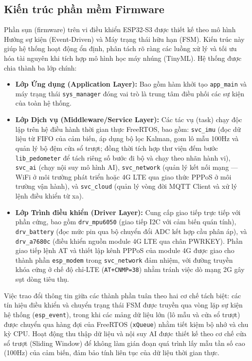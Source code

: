 \documentclass[../DoAn.tex]{subfiles}
\begin{document}
\subsection{Kiến trúc phần mềm Firmware}
Phần sụn (firmware) trên vi điều khiển ESP32-S3 được thiết kế theo mô hình Hướng sự kiện (Event-Driven) và Máy trạng thái hữu hạn (FSM). Kiến trúc này giúp hệ thống hoạt động ổn định, phân tách rõ ràng các luồng xử lý và tối ưu hóa tài nguyên khi tích hợp mô hình học máy nhúng (TinyML). Hệ thống được chia thành ba lớp chính:
\begin{itemize}
    \item \textbf{Lớp Ứng dụng (Application Layer):} Bao gồm hàm khởi tạo \texttt{app\_main} và máy trạng thái \texttt{sys\_manager} đóng vai trò là trung tâm điều phối các sự kiện của toàn hệ thống.
    \item \textbf{Lớp Dịch vụ (Middleware/Service Layer):} Các tác vụ (task) chạy độc lập trên hệ điều hành thời gian thực FreeRTOS, bao gồm: \texttt{svc\_imu} (đọc dữ liệu từ FIFO của cảm biến, áp dụng bộ lọc Kalman, gom lô mẫu 100Hz và quản lý bộ đệm cửa sổ trượt; đồng thời tích hợp thư viện đếm bước \texttt{lib\_pedometer} để tách riêng số bước đi bộ và chạy theo nhãn hành vi), \texttt{svc\_ai} (chạy nội suy mô hình AI), \texttt{svc\_network} (quản lý kết nối mạng --- WiFi ở môi trường phát triển hoặc 4G LTE qua giao thức PPPoS ở môi trường vận hành), và \texttt{svc\_cloud} (quản lý vòng đời MQTT Client và xử lý lệnh điều khiển từ xa).
    \item \textbf{Lớp Trình điều khiển (Driver Layer):} Cung cấp giao tiếp trực tiếp với phần cứng, bao gồm \texttt{drv\_mpu6050} (giao tiếp I2C với cảm biến quán tính), \texttt{drv\_battery} (đọc mức pin qua bộ chuyển đổi ADC kết hợp cầu phân áp), và \texttt{drv\_a7680c} (điều khiển nguồn module 4G LTE qua chân PWRKEY). Phần giao tiếp lệnh AT và thiết lập kênh PPPoS của module 4G được giao cho thành phần \texttt{esp\_modem} trong \texttt{svc\_network} đảm nhiệm, với đường truyền khóa cứng ở chế độ chỉ-LTE (\texttt{AT+CNMP=38}) nhằm tránh việc dò mạng 2G gây sụt dòng tiêu thụ.
\end{itemize}

Việc trao đổi thông tin giữa các thành phần tuân theo hai cơ chế tách biệt: các tín hiệu điều khiển và chuyển trạng thái FSM được truyền qua vòng lặp sự kiện hệ thống (\texttt{esp\_event}), trong khi các mảng dữ liệu lớn (lô mẫu và cửa sổ trượt) được chuyển qua hàng đợi của FreeRTOS (\texttt{xQueue}) nhằm tiết kiệm bộ nhớ và chu kỳ CPU. Hoạt động thu thập dữ liệu và nội suy AI được thiết kế theo cơ chế cửa sổ trượt (Sliding Window) để không làm gián đoạn quá trình lấy mẫu tần số cao (100Hz) của cảm biến, đảm bảo tính liên tục của dữ liệu thời gian thực.
\end{document}
